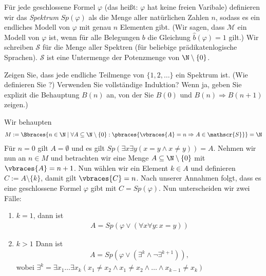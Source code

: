 Für jede geschlossene Formel $\varphi$ (das heißt: $\varphi$ hat keine freien Varibale) definieren wir das \textit{Spektrum} $Sp(\varphi)$ als die Menge aller natürlichen Zahlen $n$, sodass es ein endliches Modell von $\varphi$ mit genau $n$ Elementen gibt. \newline
(Wir sagen, dass $\mathcal{M}$ ein Modell von $\varphi$ ist, wenn für alle Belegungen $b$ die Gleichung $\hat{b}(\varphi) = 1$ gilt.) \newline
\newline
Wir schreiben $\mathscr{S}$ für die Menge aller Spektren (für beliebige prädikatenlogische Sprachen). $\mathscr{S}$ ist eine Untermenge der Potenzmenge von $\N \setminus \{0\}$. 


\begin{exercise}[71]

\phantom{}
	Zeigen Sie, dass jede endliche Teilmenge von  $\{1,2, \dots \}$ ein Spektrum ist. (Wie definieren Sie ?) Verwenden Sie vollständige Induktion? Wenn ja, geben Sie explizit die Behauptung $B(n)$ an, von der Sie $B(0)$ und $B(n) \Rightarrow B(n + 1)$ zeigen.)

\end{exercise}


\begin{solution}

\phantom{}
	Wir behaupten
	\begin{align*}
	M := \Bbraces{n \in \N \mid \forall A \subseteq \N \setminus \{0\}: \pbraces{\vbraces{A} = n \Rightarrow  A \in \mathscr{S}}} = \N
	\end{align*}
	Für $n = 0$ gilt $A = \emptyset$ und es gilt $Sp(\exists x \exists y(x = y \land x \neq y)) = A$. \newline
	Nehmen wir nun an $n \in M$ und betrachten wir eine Menge $A \subseteq \N \setminus \{0\}$ mit $\vbraces{A} = n + 1$. Nun wählen wir ein Element $k \in A$ und definieren $C := A \setminus \{k\}$, damit gilt $\vbraces{C} = n$. Nach unserer Annahmen folgt, dass es eine geschlossene Formel $\varphi$ gibt mit $C = Sp(\varphi)$. Nun unterscheiden wir zwei Fälle:
	\begin{enumerate}[label = Fall \arabic*:]
		\item $k = 1$, dann ist 
			\begin{align*}
			A = Sp(\varphi \lor (\forall x \forall y: x = y))
			\end{align*}
		\item $k > 1$ Dann ist 
			\begin{align*}
			A = Sp(\varphi \lor (\exists^k \land \neg \exists^{k + 1})),
			\end{align*}
			wobei $\exists^k = \exists x_1 \dots \exists x_k (x_1 \neq x_2 \land x_1 \neq x_2 \land \dots \land x_{k - 1} \neq x_k)$
	\end{enumerate} 
\end{solution}
